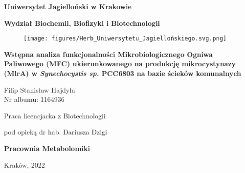 \begin{titlepage}
    \thispagestyle{empty}
    \begin{center}
    
        \textbf{\large Uniwersytet Jagielloński w Krakowie}
        
        \vspace{0.5cm}
        
        \textbf{\Large Wydział Biochemii, Biofizyki i Biotechnologii}
        
        \vspace{0.5cm}
        
        \begin{figure}[h]
            \centering
            \texttt{[image: figures/Herb\_Uniwersytetu\_Jagiellońskiego.svg.png]}
            \label{fig:title}
        \end{figure}
        
        \vspace{0.5cm}

        \textbf{\LARGE Wstępna analiza funkcjonalności Mikrobiologicznego Ogniwa Paliwowego (MFC) ukierunkowanego na produkcję mikrocystynazy (MlrA) w \textit{Synechocystis sp.} PCC6803 na bazie ścieków komunalnych}

        \vspace{\fill}


        \vspace{\fill}

        {\large Filip Stanisław Hajdyła}\\
        Nr albumu: 1164936

        \vspace{1.5cm}
        
        {\large Praca licencjacka z Biotechnologii}
        
        \vspace{0.3cm}
        
        {\large pod opieką dr hab. Dariusza Dzigi}
        
        \vspace{1cm}
        
        \textbf{\Large Pracownia Metabolomiki}
        
        \vspace{1cm}
        
        Kraków, 2022
        
    \end{center}
\end{titlepage}